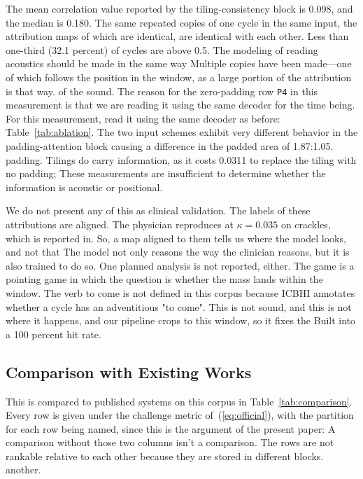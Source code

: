 \documentclass[journal,onecolumn]{IEEEtran}
\begin{document}
The mean correlation value reported by the tiling-consistency block is 0.098, and the median is 0.180.
The same repeated copies of one cycle in the same input, the attribution maps of which are identical, are identical with each other.
Less than one-third (32.1 percent) of cycles are above 0.5. The modeling of reading acoustics should be made in the same way
Multiple copies have been made—one of which follows the position in the window, as a large portion of the attribution is that way.
of the sound. The reason for the zero-padding row \texttt{P4} in this measurement is that we are reading it using the same decoder for the time being. For this measurement, read it using the same decoder as before:
Table~\ref{tab:ablation}. The two input schemes exhibit very different behavior in the padding-attention block 
causing a difference in the padded area of 1.87:1.05.
padding. Tilings do carry information, as it costs 0.0311 to replace the tiling with no padding;
These measurements are insufficient to determine whether the information is acoustic or positional.

We do not present any of this as clinical validation. The labels of these attributions are aligned.
The physician reproduces at $\kappa = 0.035$ on crackles, which is reported in.
So, a map aligned to them tells us where the model looks, and not that
The model not only reasons the way the clinician reasons, but it is also trained to do so. One planned analysis is not reported, either.
The game is a pointing game in which the question is whether the mass lands within the window.
The verb to come is not defined in this corpus because ICBHI annotates whether a cycle has an adventitious "to come".
This is not sound, and this is not where it happens, and our pipeline crops to this window, so it fixes the
Built into a 100 percent hit rate.

\subsection{Comparison with Existing Works}
\label{subsec:comparison}

This is compared to published systems on this corpus in Table~\ref{tab:comparison}.
Every row is given under the challenge metric of~(\ref{eq:official}), with the partition for each row being
named, since this is the argument of the present paper: A comparison without those two columns isn't a
comparison. The rows are not rankable relative to each other because they are stored in different blocks.
another.
\end{document}
